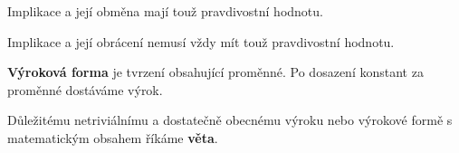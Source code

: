 \begin{veta}
  Implikace a její obměna mají touž pravdivostní hodnotu.
\end{veta}

\begin{pozn}
  Implikace a její obrácení nemusí vždy mít touž pravdivostní hodnotu.
\end{pozn}

\begin{definition}
  \textbf{Výroková forma} je tvrzení obsahující proměnné. Po dosazení konstant za proměnné dostáváme výrok.
\end{definition}

\begin{pozn}
  Důležitému netriviálnímu a dostatečně obecnému výroku nebo výrokové formě s matematickým obsahem říkáme \textbf{věta}.
\end{pozn}

